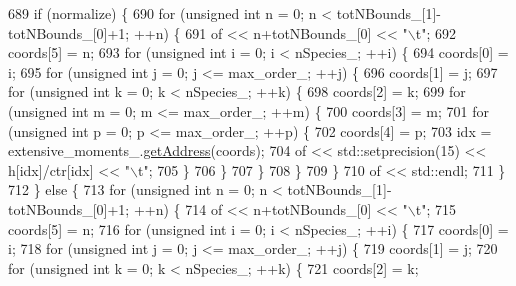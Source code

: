 \begin{DoxyCode}
689     \textcolor{keywordflow}{if} (normalize) \{
690         \textcolor{keywordflow}{for} (\textcolor{keywordtype}{unsigned} \textcolor{keywordtype}{int} n = 0; n < totNBounds\_[1]-totNBounds\_[0]+1; ++n) \{
691             of << n+totNBounds\_[0] << \textcolor{stringliteral}{"\(\backslash\)t"};
692             coords[5] = n;
693             \textcolor{keywordflow}{for} (\textcolor{keywordtype}{unsigned} \textcolor{keywordtype}{int} i = 0; i < nSpecies\_; ++i) \{
694                 coords[0] = i;
695                 \textcolor{keywordflow}{for} (\textcolor{keywordtype}{unsigned} \textcolor{keywordtype}{int} j = 0; j <= max\_order\_; ++j) \{
696                     coords[1] = j;
697                     \textcolor{keywordflow}{for} (\textcolor{keywordtype}{unsigned} \textcolor{keywordtype}{int} k = 0; k < nSpecies\_; ++k) \{
698                         coords[2] = k;
699                         \textcolor{keywordflow}{for} (\textcolor{keywordtype}{unsigned} \textcolor{keywordtype}{int} m = 0; m <= max\_order\_; ++m) \{
700                             coords[3] = m;
701                             \textcolor{keywordflow}{for} (\textcolor{keywordtype}{unsigned} \textcolor{keywordtype}{int} p = 0; p <= max\_order\_; ++p) \{
702                                 coords[4] = p;
703                                 idx = extensive\_moments\_.\hyperlink{classhistogram_ae52fa58934b56e05846a66e43c3184bd}{getAddress}(coords);
704                                 of << std::setprecision(15) << h[idx]/ctr[idx] << \textcolor{stringliteral}{"\(\backslash\)t"};
705                             \}
706                         \}
707                     \}
708                 \}
709             \}
710             of << std::endl;
711         \}
712     \} \textcolor{keywordflow}{else} \{
713         \textcolor{keywordflow}{for} (\textcolor{keywordtype}{unsigned} \textcolor{keywordtype}{int} n = 0; n < totNBounds\_[1]-totNBounds\_[0]+1; ++n) \{
714             of << n+totNBounds\_[0] << \textcolor{stringliteral}{"\(\backslash\)t"};
715             coords[5] = n;
716             \textcolor{keywordflow}{for} (\textcolor{keywordtype}{unsigned} \textcolor{keywordtype}{int} i = 0; i < nSpecies\_; ++i) \{
717                 coords[0] = i;
718                 \textcolor{keywordflow}{for} (\textcolor{keywordtype}{unsigned} \textcolor{keywordtype}{int} j = 0; j <= max\_order\_; ++j) \{
719                     coords[1] = j;
720                     \textcolor{keywordflow}{for} (\textcolor{keywordtype}{unsigned} \textcolor{keywordtype}{int} k = 0; k < nSpecies\_; ++k) \{
721                         coords[2] = k;

\end{DoxyCode}
